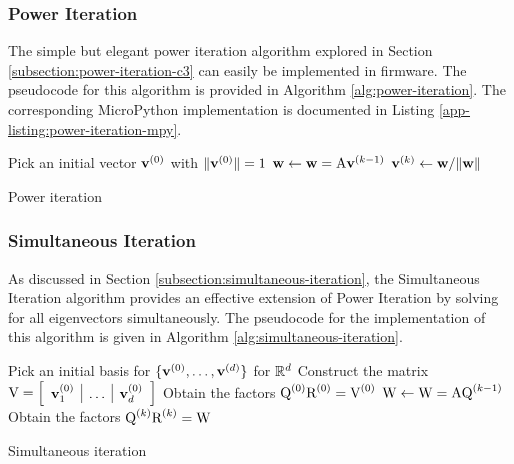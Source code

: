 \subsubsection{Power Iteration}
The simple but elegant power iteration algorithm explored in Section \ref{subsection:power-iteration-c3} can easily be implemented in firmware. The pseudocode for this algorithm is provided in Algorithm \ref{alg:power-iteration}. The corresponding MicroPython implementation is documented in Listing \ref{app-listing:power-iteration-mpy}.
\begin{algorithm}
\begin{algorithmic}
\State Pick an initial vector ${\mathbf{v}}^{(0)}$ with $\|{\mathbf{v}}^{(0)}\|=1$ 
 
    \State ${\mathbf{w}} \gets {\mathbf{w}} = {\textrm{A}}{\mathbf{v}}^{(k-1)}$ 
    \State ${\mathbf{v}}^{(k)} \gets {\mathbf{w}} / \| {\mathbf{w}}\|$ 
\EndFor
\end{algorithmic}
\caption{Power iteration}
\label{alg:power-iteration}
\end{algorithm}

\subsubsection{Simultaneous Iteration}
As discussed in Section \ref{subsection:simultaneous-iteration}, the Simultaneous Iteration algorithm provides an effective extension of Power Iteration by solving for all eigenvectors simultaneously. The pseudocode for the implementation of this algorithm is given in Algorithm \ref{alg:simultaneous-iteration}.
\begin{algorithm}
\begin{algorithmic}
\State Pick an initial basis for $\{{\mathbf{v}}^{(0)}, \dots, {\mathbf{v}}^{(d)} \}$ for $\mathbb{R}^d$ 
\State Construct the matrix ${\textrm{V}} = \left[\begin{array}{l|l|l}{\mathbf{v}}_1^{(0)} & \dots & {\mathbf{v}}_d^{(0)}\end{array}\right]$
\State Obtain the factors ${\textrm{Q}}^{(0)}{\textrm{R}}^{(0)} = {\textrm{V}}^{(0)}$ 
{}
    \State ${\textrm{W}} \gets {\textrm{W}} = {\textrm{A}}{\textrm{Q}}^{(k-1)}$ 
    \State Obtain the factors ${\textrm{Q}}^{(k)}{\textrm{R}}^{(k)} = {\textrm{W}}$ 
\EndFor
\end{algorithmic}
\caption{Simultaneous iteration}
\label{alg:simultaneous-iteration}
\end{algorithm}

